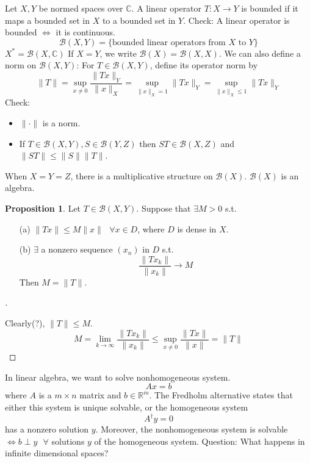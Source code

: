 \documentclass{article}
\theoremstyle{definition}
\newtheorem{prop}{Proposition}
\newenvironment{proofs}[1][\proofname]{%
  \begin{proof}[#1]$ $\par\nobreak\ignorespaces
}{%
  \end{proof}
}
\newcommand{\sfa}{\text{  } \forall}
\begin{document}
Let $X, Y$ be normed spaces over $\mathbb{C}$.
A linear operator $T:X \to Y$ is bounded if it maps a bounded set in $X$ to a bounded set in $Y$.
Check: A linear operator is bounded $\Leftrightarrow$ it is continuous.
\[
	\mathcal{B}(X, Y) = \{\text{bounded linear operators from }X \text{ to }Y \}
\]
$X^* = \mathcal{B}(X, \mathbb{C})$
If $X = Y$, we write $\mathcal{B}(X) = \mathcal{B}(X, X)$.
We can also define a norm on $\mathcal{B}(X, Y)$:
For $T \in \mathcal{B}(X, Y)$, define its operator norm by 
\[
	\|T\| = \sup_{x \neq 0} \frac{\|T x \|_Y}{\|x\|_X} = \sup_{\|x\|_X = 1} \|Tx\|_Y = \sup_{\|x\|_X \leq 1} \|Tx\|_Y
\]
Check: 
\begin{itemize}
	\item $\|\cdot\|$ is a norm.

	\item If $T \in \mathcal{B}(X, Y), S \in \mathcal{B}(Y, Z)$ then $ST \in \mathcal{B}(X, Z)$ and $\|ST\| \leq \|S\|\|T\|$.

\end{itemize}

When $X = Y = Z$, there is a multiplicative structure on $\mathcal{B}(X)$.
$\mathcal{B}(X)$ is an algebra.

\begin{prop}
	Let $T \in \mathcal{B}(X, Y)$. 
	Suppose that $\exists M > 0$ s.t.
	\begin{enumerate}
		\item[(a)] $\|Tx\| \leq M \|x\| \sfa x \in D$, where $D$ is dense in $X$.

		\item[(b)] $\exists$ a nonzero sequence $(x_n)$ in $D$ s.t.
			\[
				\frac{\|T x_k\|}{\|x_k\|} \to M
			\]
			Then $M = \|T\|$.
	\end{enumerate}
\end{prop}

\begin{proofs}
	Clearly(?), $\|T\| \leq M$.
	\[
		M = \lim_{k \to \infty}\frac{\|T x_k\|}{\|x_k\|} \leq \sup_{x \neq 0}\frac{\|Tx\|}{\|x\|} = \|T\|
	\]
\end{proofs}

In linear algebra, we want to solve nonhomogeneous system.
\[
	Ax = b
\]
where $A$ is a $m \times n$ matrix and $b \in \mathbb{R}^m$.
The Fredholm alternative states that either this system is unique solvable, or the homogeneous system
\[
	A^{\dagger} y = 0
\]
has a nonzero solution $y$.
Moreover, the nonhomogeneous system is solvable $\Leftrightarrow b \perp y \sfa$ solutions $y$ of the homogeneous system. 
Question: What happens in infinite dimensional spaces?
\end{document}
